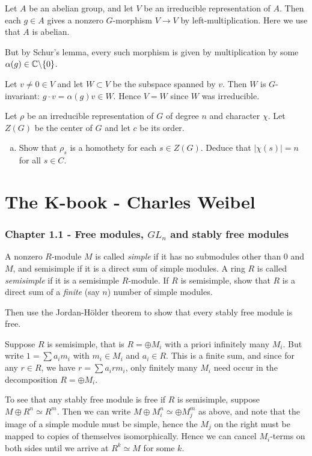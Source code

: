 \documentclass[11pt, english]{article}
\begin{document}
\begin{sol}
Let $A$ be an abelian group, and let $V$ be an irreducible representation of $A$. Then each $g \in A$ gives  a nonzero $G$-morphism $V \to V$ by left-multiplication. Here we use that $A$ is abelian.

But by Schur's lemma, every such morphism is given by multiplication by some $\alpha(g) \in \mathbb{C} \backslash \{ 0\}$.

Let $v \neq 0 \in V$ and let $W \subset V$ be the subspace spanned by $v$. Then $W$ is $G$-invariant: $g \cdot v = \alpha(g) v \in W$. Hence $V=W$ since $W$ was irreducible.
\end{sol}

\begin{exc}
 Let $\rho$ be an irreducible representation of $G$ of degree $n$ and character $\chi$. Let $Z(G)$ be the center of $G$ and let $c$ be its order.
 \begin{enumerate}[a)]
 \item Show that $\rho_s$ is a homothety for each $s \in Z(G)$. Deduce that $\lvert \chi(s) \rvert = n$ for all $ s \in C$. 
 \end{enumerate}
\end{exc}

\section{The K-book - Charles Weibel}

\subsubsection{Chapter 1.1 - Free modules, $GL_n$ and stably free modules}

\begin{exc}

A nonzero $R$-module $M$ is called \emph{simple} if it has no submodules other than $0$ and $M$, and semisimple if it is a direct sum of simple modules. A ring $R$ is called \emph{semisimple} if it is a semisimple $R$-module. If $R$ is semisimple, show that $R$ is a direct sum of a \emph{finite} (say $n$) number of simple modules.

Then use the Jordan-Hölder theorem to show that every stably free module is free.  
\end{exc}
\begin{sol}
Suppose $R$ is semisimple, that is $R = \oplus M_i$ with a priori infinitely many $M_i$. But write $1 = \sum a_im_i$ with $m_i \in M_i$ and $a_i \in R$. This is a finite sum, and since for any $r \in R$, we have $r = \sum a_irm_i$, only finitely many $M_i$ need occur in the decomposition $R=\oplus M_i$. 

To see that any stably free module is free if $R$ is semisimple, suppose $M \oplus R^n \simeq R^m$. Then we can write $M \oplus M_i^n \simeq \oplus M_j^m$ as above, and note that the image of a simple module must be simple, hence the $M_j$ on the right must be mapped to copies of themselves isomorphically. Hence we can cancel $M_i$-terms on both sides until we arrive at $R^k \simeq M$ for some $k$.
\end{sol}
\end{document}
